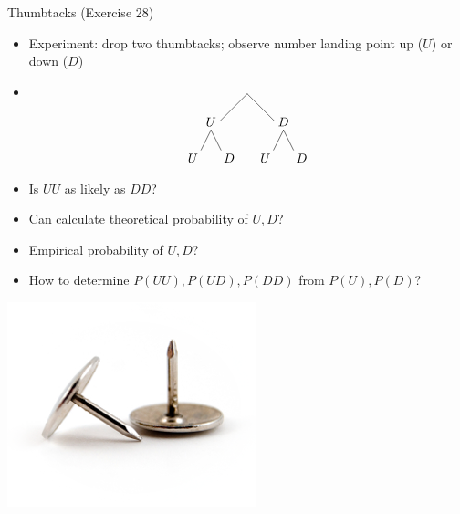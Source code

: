 \documentclass[handout]{beamer}
\theoremstyle{definition}
\begin{document}
\begin{frame}{Thumbtacks (Exercise 28)}
\begin{multicols}{2}
\begin{itemize}
\item Experiment: drop two thumbtacks; observe number
landing point up ($U$) or down ($D$)
\item
\[\begin{xy}<1cm,0cm>:
(0,0)="0";
(-1,-1)="1";
(1,-1)="2";
"0";"1"*+!D{U}**\dir{-};
"0";"2"*+!D{D}**\dir{-};
"1";(-1.5,-2)*+!D{U}**\dir{-};
"1";(-.5,-2)*+!D{D}**\dir{-};
"2";(.5,-2)*+!D{U}**\dir{-};
"2";(1.5,-2)*+!D{D}**\dir{-};
\end{xy}\]
\item Is $UU$ as likely as $DD$?
\item Can calculate theoretical probability of $U,D$?
\item Empirical probability of $U,D$?
\item How to determine $P\left(UU\right),P\left(UD\right),
P\left(DD\right)$
from $P\left(U\right),P\left(D\right)$?
\end{itemize}
\includegraphics[scale=.5]{Thumbtacks}
\end{multicols}
\end{frame}
\end{document}
